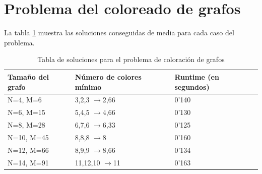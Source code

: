 \documentclass{article}
\begin{document}
\section {\large{Problema del coloreado de grafos}}

\vspace {1cm}

La tabla \ref{tab:tabcolores} muestra las soluciones conseguidas de media para cada caso del problema.
\begin{table}[ht]
  \begin{center}
    \begin{spacing}{1.5}
    \begin{tabular}{| l | l | l | }
      \hline
      Tamaño del grafo & {Número de colores mínimo} & Runtime (en segundos) \\ \hline
      N=4, M=6 & 3,2,3 $\rightarrow${2,66}  & 0'140  \\ \hline

      N=6, M=15 & 5,4,5 $\rightarrow${4,66} & 0'130 \\ \hline

      N=8, M=28 & 6,7,6 $\rightarrow${6,33} & 0'125 \\ \hline

      N=10, M=45 & 8,8,8 $\rightarrow${8} & 0'160 \\ \hline

      N=12, M=66 & 8,9,9 $\rightarrow${8,66} & 0'134 \\ \hline

      N=14, M=91 & 11,12,10 $\rightarrow${11} & 0'163 \\ \hline
    \end{tabular}
    \end{spacing}
    \caption{Tabla de soluciones para el problema de coloración de grafos}
    \label{tab:tabcolores}
  \end{center}
\end{table}
\end{document}
